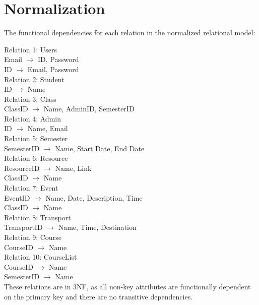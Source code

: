 \section{Normalization}\label{sec:norm}

 The functional dependencies for each relation in the normalized relational model:

Relation 1: Users\\


Email $\rightarrow$ ID, Password\\

 ID $\rightarrow$ Email, Password\\

Relation 2: Student\\


ID $\rightarrow$ Name\\

Relation 3: Class\\


ClassID $\rightarrow$ Name, AdminID, SemesterID\\

Relation 4: Admin\\


ID $\rightarrow$ Name, Email\\


Relation 5: Semester\\

SemesterID $\rightarrow$ Name, Start Date, End Date\\

Relation 6: Resource\\


ResourceID $\rightarrow$ Name, Link\\

ClassID $\rightarrow$ Name \\

Relation 7: Event\\


EventID $\rightarrow$ Name, Date, Description, Time\\

ClassID $\rightarrow$ Name \\


Relation 8: Transport \\

TransportID $\rightarrow$ Name, Time, Destination \\


Relation 9: Course\\

CourseID $\rightarrow$ Name \\


Relation 10: CourseList\\

CourseID $\rightarrow$ Name \\

SemesterID $\rightarrow$ Name \\

These relations are in 3NF, as all non-key attributes are functionally dependent on the primary key and there are no transitive dependencies.\\




\clearpage